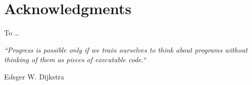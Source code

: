 {}

\begingroup

\chapter*{Acknowledgments}

To \dots

\epigraph{\textit{``Progress is possible only if we train ourselves to think 
about programs without thinking of them as pieces of executable code.``}}
{Edsger W. Dijkstra}


\endgroup
